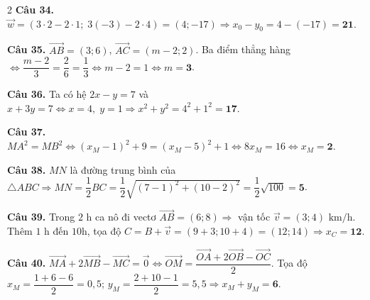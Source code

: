 \documentclass[12pt,a4paper]{article}
\begin{document}
\begin{multicols}{2}
\textbf{Câu 34.} $\vec{w} = (3\cdot 2 - 2\cdot 1;\; 3(-3) - 2\cdot 4) = (4; -17) \Rightarrow x_0 - y_0 = 4 - (-17) = \mathbf{21}$.\par\vspace{2.5pt}

\textbf{Câu 35.} $\vec{AB} = (3; 6)$, $\vec{AC} = (m - 2; 2)$. Ba điểm thẳng hàng $\Leftrightarrow \dfrac{m - 2}{3} = \dfrac{2}{6} = \dfrac{1}{3} \Leftrightarrow m - 2 = 1 \Leftrightarrow m = \mathbf{3}$.\par\vspace{2.5pt}

\textbf{Câu 36.} Ta có hệ $2x - y = 7$ và $x + 3y = 7 \Leftrightarrow x = 4,\; y = 1 \Rightarrow x^2 + y^2 = 4^2 + 1^2 = \mathbf{17}$.\par\vspace{2.5pt}

\textbf{Câu 37.} $MA^2 = MB^2 \Leftrightarrow (x_M - 1)^2 + 9 = (x_M - 5)^2 + 1 \Leftrightarrow 8x_M = 16 \Leftrightarrow x_M = \mathbf{2}$.\par\vspace{2.5pt}

\textbf{Câu 38.} $MN$ là đường trung bình của $\triangle ABC \Rightarrow MN = \dfrac{1}{2}BC = \dfrac{1}{2}\sqrt{(7 - 1)^2 + (10 - 2)^2} = \dfrac{1}{2}\sqrt{100} = \mathbf{5}$.\par\vspace{2.5pt}

\textbf{Câu 39.} Trong $2\text{ h}$ ca nô đi vectơ $\vec{AB} = (6; 8) \Rightarrow$ vận tốc $\vec{v} = (3; 4)\text{ km/h}$. Thêm $1\text{ h}$ đến $10\text{h}$, tọa độ $C = B + \vec{v} = (9 + 3; 10 + 4) = (12; 14) \Rightarrow x_C = \mathbf{12}$.\par\vspace{2.5pt}

\textbf{Câu 40.} $\vec{MA} + 2\vec{MB} - \vec{MC} = \vec{0} \Leftrightarrow \vec{OM} = \dfrac{\vec{OA} + 2\vec{OB} - \vec{OC}}{2}$. Tọa độ $x_M = \dfrac{1 + 6 - 6}{2} = 0{,}5$; $y_M = \dfrac{2 + 10 - 1}{2} = 5{,}5 \Rightarrow x_M + y_M = \mathbf{6}$.\par\vspace{2.5pt}

\end{multicols}
\end{document}
